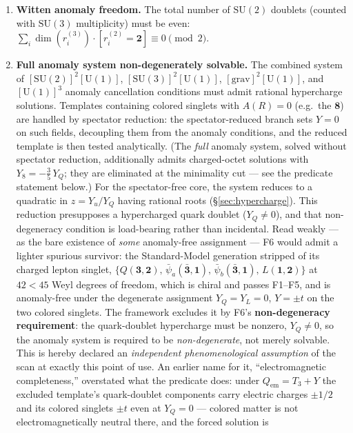 \documentclass[11pt]{article}
\theoremstyle{definition}
\newcommand{\SU}{\mathrm{SU}}
\newcommand{\U}{\mathrm{U}}
\begin{document}
\begin{enumerate}[label=\textbf{F\arabic*},nosep,leftmargin=3em]
  \item \textbf{Witten anomaly freedom.}\quad
  The total number of $\SU(2)$ doublets (counted with $\SU(3)$ multiplicity)
  must be even: $\sum_i \dim(r_i^{(3)}) \cdot [r_i^{(2)} = \mathbf{2}]
  \equiv 0 \pmod{2}$.

  \item \textbf{Full anomaly system non-degenerately solvable.}\quad
  The combined system of $[\SU(2)]^2[\U(1)]$, $[\SU(3)]^2[\U(1)]$,
  $[\mathrm{grav}]^2[\U(1)]$, and $[\U(1)]^3$ anomaly cancellation
  conditions must admit rational hypercharge solutions.  Templates
  containing colored singlets with $A(R) = 0$ (e.g.\ the $\mathbf{8}$)
  are handled by spectator reduction: the spectator-reduced branch
  sets $Y = 0$ on such fields, decoupling them from the anomaly
  conditions, and the reduced template is then tested analytically.
  (The \emph{full} anomaly system, solved without spectator reduction,
  additionally admits charged-octet solutions with
  $Y_8 = -\tfrac{3}{5}\,Y_Q$; they are eliminated at the minimality
  cut --- see the predicate statement below.)  For the spectator-free core, the system reduces
  to a quadratic in $z = Y_u/Y_Q$ having rational roots
  (\S\ref{sec:hypercharge}).  This reduction presupposes a hypercharged
  quark doublet ($Y_Q \neq 0$), and that non-degeneracy condition is
  load-bearing rather than incidental.  Read weakly --- as the bare
  existence of \emph{some} anomaly-free assignment --- F6 would admit a
  lighter spurious survivor: the Standard-Model generation stripped of its
  charged lepton singlet, $\{Q(\mathbf{3},\mathbf{2}),\,
  \bar\psi_a(\bar{\mathbf{3}},\mathbf{1}),\,
  \bar\psi_b(\bar{\mathbf{3}},\mathbf{1}),\, L(\mathbf{1},\mathbf{2})\}$
  at $42 < 45$ Weyl degrees of freedom, which is chiral and passes
  F1--F5, and is anomaly-free under the degenerate assignment
  $Y_Q = Y_L = 0$, $Y = \pm t$ on the two colored singlets.  The framework
  excludes it by F6's \textbf{non-degeneracy requirement}: the
  quark-doublet hypercharge must be nonzero, $Y_Q \neq 0$, so the
  anomaly system is required to be \emph{non-degenerate}, not merely
  solvable.  This is hereby declared an \emph{independent
  phenomenological assumption} of the scan at exactly this point of
  use.  An earlier name for it, ``electromagnetic completeness,''
  overstated what the predicate does: under
  $Q_{\mathrm{em}} = T_3 + Y$ the excluded template's quark-doublet
  components carry electric charges $\pm 1/2$ and its colored
  singlets $\pm t$ even at $Y_Q = 0$ --- colored matter is not
  electromagnetically neutral there, and the forced solution is

\end{enumerate}
\end{document}
